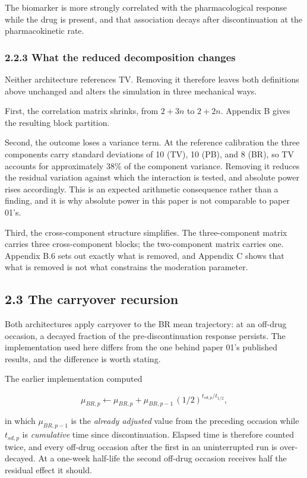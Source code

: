 \documentclass[
  11pt,
]{article}
\begin{document}
The biomarker is more strongly correlated with the pharmacological
response while the drug is present, and that association decays after
discontinuation at the pharmacokinetic rate.

\subsubsection{2.2.3 What the reduced decomposition changes}

Neither architecture references TV. Removing it therefore leaves both
definitions above unchanged and alters the simulation in three
mechanical ways.

First, the correlation matrix shrinks, from \(2 + 3n\) to \(2 + 2n\).
Appendix B gives the resulting block partition.

Second, the outcome loses a variance term. At the reference
calibration the three components carry standard deviations of 10
(TV), 10 (PB), and 8 (BR), so TV accounts for approximately 38\% of
the component variance. Removing it reduces the residual variation
against which the interaction is tested, and absolute power rises
accordingly. This is an expected arithmetic consequence rather than a
finding, and it is why absolute power in this paper is not comparable
to paper 01's.

Third, the cross-component structure simplifies. The three-component
matrix carries three cross-component blocks; the two-component matrix
carries one. Appendix B.6 sets out exactly what is removed, and
Appendix C shows that what is removed is not what constrains the
moderation parameter.

\subsection{2.3 The carryover recursion}

Both architectures apply carryover to the BR mean trajectory: at an
off-drug occasion, a decayed fraction of the pre-discontinuation
response persists. The implementation used here differs from the one
behind paper 01's published results, and the difference is worth
stating.

The earlier implementation computed

\[
\mu_{BR,p} \leftarrow \mu_{BR,p} + \mu_{BR,p-1}\,
  (1/2)^{t_{sd,p}/t_{1/2}},
\]

in which \(\mu_{BR,p-1}\) is the \emph{already adjusted} value from the
preceding occasion while \(t_{sd,p}\) is \emph{cumulative} time since
discontinuation. Elapsed time is therefore counted twice, and every
off-drug occasion after the first in an uninterrupted run is
over-decayed. At a one-week half-life the second off-drug occasion
receives half the residual effect it should.
\end{document}
